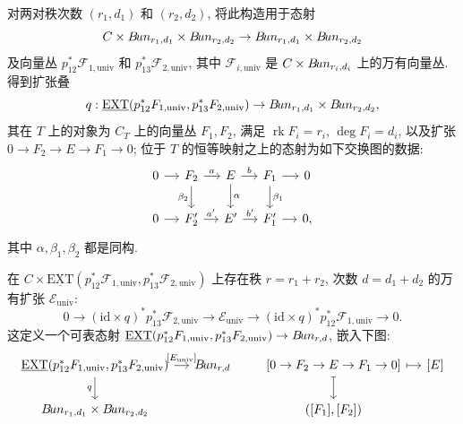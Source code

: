 \begin{remark}[万有扩张]\label{src:9.2.15}
对两对秩次数 $(r_1,d_1)$ 和 $(r_2,d_2)$, 将此构造用于态射
\[
C\times B\!un_{r_1,d_1}\times B\!un_{r_2,d_2}\to B\!un_{r_1,d_1}\times B\!un_{r_2,d_2}
\]
及向量丛 $p_{12}^*\mathcal F_{1,\mathrm{univ}}$ 和 $p_{13}^*\mathcal F_{2,\mathrm{univ}}$, 其中 $\mathcal F_{i,\mathrm{univ}}$ 是 $C\times B\!un_{r_i,d_i}$ 上的万有向量丛. 得到扩张叠
\[
q:\underline{\mathrm{EXT}}(p_{12}^*F_{1,\mathrm{univ}},p_{13}^*F_{2,\mathrm{univ}})
\to B\!un_{r_1,d_1}\times B\!un_{r_2,d_2},
\]
其在 $T$ 上的对象为 $C_T$ 上的向量丛 $F_1,F_2$, 满足 $\operatorname{rk}F_i=r_i$, $\deg F_i=d_i$, 以及扩张 $0\to F_2\to E\to F_1\to0$; 位于 $T$ 的恒等映射之上的态射为如下交换图的数据:
\[
\begin{tikzcd}[ampersand replacement=\&,column sep=small]
0\arrow[r]\&F_2\arrow[r,"a"]\arrow[d,"\beta_2"']\&E\arrow[r,"b"]\arrow[d,"\alpha"]\&F_1\arrow[r]\arrow[d,"\beta_1"]\&0\\
0\arrow[r]\&F_2'\arrow[r,"a'"]\&E'\arrow[r,"b'"]\&F_1'\arrow[r]\&0,
\end{tikzcd}
\]
其中 $\alpha,\beta_1,\beta_2$ 都是同构.

在 $C\times\underline{\mathrm{EXT}}(p_{12}^*\mathcal F_{1,\mathrm{univ}},p_{13}^*\mathcal F_{2,\mathrm{univ}})$ 上存在秩 $r=r_1+r_2$, 次数 $d=d_1+d_2$ 的万有扩张 $\mathcal E_{\mathrm{univ}}$:
\[
0\to(\mathrm{id}\times q)^*p_{13}^*\mathcal F_{2,\mathrm{univ}}
\to\mathcal E_{\mathrm{univ}}\to(\mathrm{id}\times q)^*p_{12}^*\mathcal F_{1,\mathrm{univ}}\to0.
\]
这定义一个可表态射 $\underline{\mathrm{EXT}}(p_{12}^*F_{1,\mathrm{univ}},p_{13}^*F_{2,\mathrm{univ}})\to B\!un_{r,d}$, 嵌入下图:
\[
\begin{tikzcd}[ampersand replacement=\&,column sep=small]
\underline{\mathrm{EXT}}(p_{12}^*\mathcal F_{1,\mathrm{univ}},p_{13}^*\mathcal F_{2,\mathrm{univ}})\arrow[r,"{[\mathcal E_{\mathrm{univ}}]}"]\arrow[d,"q"']\&\cBun_{r,d}\\
\cBun_{r_1,d_1}\times\cBun_{r_2,d_2}\&{}
\end{tikzcd}
\qquad
\begin{tikzcd}[ampersand replacement=\&,column sep=small]
{[0\to F_2\to E\to F_1\to0]}\arrow[r,mapsto]\arrow[d,mapsto]\&{[E]}\\
{([F_1],[F_2])}\&{}
\end{tikzcd}
\]
\end{remark}
